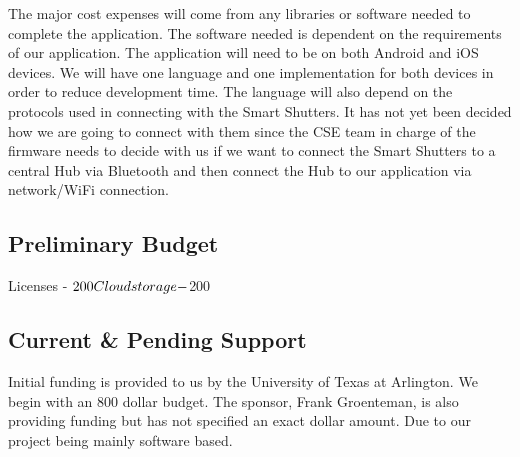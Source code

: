 The major cost expenses will come from any libraries or software needed to complete the application. The software needed is dependent on the requirements of our application. The application will need to be on both Android and iOS devices. We will have one language and one implementation for both devices in order to reduce development time. The language will also depend on the protocols used in connecting with the Smart Shutters. It has not yet been decided how we are going to connect with them since the CSE team in charge of the firmware needs to decide with us if we want to connect the Smart Shutters to a central Hub via Bluetooth and then connect the Hub to our application via network/WiFi connection. 


\subsection{Preliminary Budget}
 Licenses - $200 \newline
Cloud storage - $200


\subsection{Current \& Pending Support}
Initial funding is provided to us by the University of Texas at Arlington. We begin with an 800 dollar budget. The sponsor, Frank Groenteman, is also providing funding but has not specified an exact dollar amount. Due to our project being mainly software based. 
